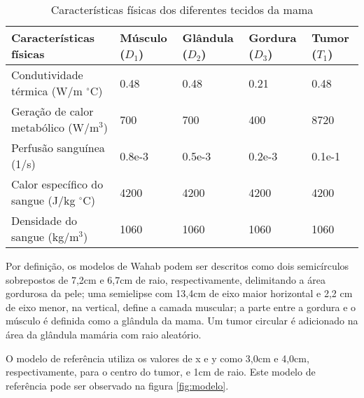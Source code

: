 \begin{table}[!ht]
    \centering
    \begin{tabularx}{\textwidth}{|lXXXX|}
    \hline
Características físicas & Músculo ($D_1$) & Glândula ($D_2$) & Gordura ($D_3$) & Tumor ($T_1$) \\ \hline
Condutividade térmica (W/m $^\circ$C) & 0.48 & 0.48 & 0.21 & 0.48 \\ 
Geração de calor metabólico (W/m$^3$) & 700 & 700 & 400 & 8720\\ 
Perfusão sanguínea (1/s) & 0.8e-3 & 0.5e-3 & 0.2e-3 & 0.1e-1 \\ 
Calor específico do sangue (J/kg $^\circ$C) & 4200 & 4200 & 4200 & 4200 \\ 
Densidade do sangue (kg/m$^3$) & 1060 & 1060 & 1060 & 1060 \\ \hline
    \end{tabularx}
    \caption{Características físicas dos diferentes tecidos da mama}
    \label{tab:wahab2}
\end{table}

Por definição, os modelos de Wahab podem ser descritos como dois semicírculos sobrepostos de 7,2cm e 6,7cm de raio, respectivamente, delimitando a área gordurosa da pele; uma semielipse com 13,4cm de eixo maior horizontal e 2,2 cm de eixo menor, na vertical, define a camada muscular; a parte entre a gordura e o músculo é definida como a glândula da mama. Um tumor circular é adicionado na área da glândula mamária com raio aleatório.

O modelo de referência utiliza os valores de x e y como 3,0cm e 4,0cm, respectivamente, para o centro do tumor, e 1cm de raio. Este modelo de referência pode ser observado na figura \ref{fig:modelo}.

\vspace{15px}

